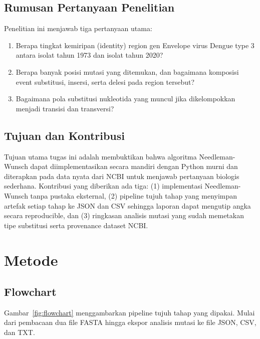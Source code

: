 \documentclass[conference]{IEEEtran}
\begin{document}
\subsection{Rumusan Pertanyaan Penelitian}
Penelitian ini menjawab tiga pertanyaan utama:
\begin{enumerate}
\item Berapa tingkat kemiripan (identity) region gen Envelope virus Dengue type 3 antara isolat tahun 1973 dan isolat tahun 2020?
\item Berapa banyak posisi mutasi yang ditemukan, dan bagaimana komposisi event substitusi, insersi, serta delesi pada region tersebut?
\item Bagaimana pola substitusi nukleotida yang muncul jika dikelompokkan menjadi transisi dan transversi?
\end{enumerate}

\subsection{Tujuan dan Kontribusi}
Tujuan utama tugas ini adalah membuktikan bahwa algoritma Needleman-Wunsch dapat diimplementasikan secara mandiri dengan Python murni dan diterapkan pada data nyata dari NCBI untuk menjawab pertanyaan biologis sederhana. Kontribusi yang diberikan ada tiga: (1) implementasi Needleman-Wunsch tanpa pustaka eksternal, (2) pipeline tujuh tahap yang menyimpan artefak setiap tahap ke JSON dan CSV sehingga laporan dapat mengutip angka secara reproducible, dan (3) ringkasan analisis mutasi yang sudah memetakan tipe substitusi serta provenance dataset NCBI.

\section{Metode}

\subsection{Flowchart}

Gambar~\ref{fig:flowchart} menggambarkan pipeline tujuh tahap yang dipakai. Mulai dari pembacaan dua file FASTA hingga ekspor analisis mutasi ke file JSON, CSV, dan TXT.
\end{document}
